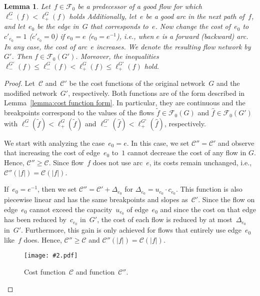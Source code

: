 \documentclass[11pt]{article}
\newtheorem{lemma}[theorem]{Lemma}
\newcommand{\F}{\mathcal{F}}
\renewcommand{\sp}{\ell}
\newcommand{\COST}{\mathscr{C}}
\newcommand{\spm}[1][]{\sp^{#1}_{-}}
\newcommand{\spp}[1][]{\sp^{#1}_{+}}
\newcommand{\GFX}[2][]{\texttt{[image: \#2.pdf]}}
\newenvironment{fig}
{\begin{figure}[th]\begin{center}}
{\end{center}\end{figure}}
\newenvironment{GFXFIG}[2][]
{\begin{fig}\GFX[#1]{#2}}
{\end{fig}}
\begin{document}
\begin{lemma}
\label{lemma:cost monotonicity}
Let~$f \in \F_0$ be a predecessor of a good flow for which $\spm[G](f) < \spp[G](f)$ holds Additionally, let~$e$ be a good arc in the next path of~$f$, and let~$e_0$ be the edge in~$G$ that corresponds to~$e$. Now change the cost of~$e_0$ to $c'_{e_0} = 1$ ($c'_{e_0} = 0$) if $e_0 = e$ ($e_0 = e^{-1}$), i.e., when $e$ is a forward (backward) arc. In any case, the cost of arc~$e$ increases. We denote the resulting flow network by~$G'$. Then $f \in \F_0(G')$. Moreover, the inequalities
$
  \spm[G'](f) \leq \spm[G](f) < \spp[G](f) \leq \spp[G'](f)
$
hold.
\end{lemma}

\begin{proof}
Let~$\COST$ and~$\COST'$ be the cost functions of the original network~$G$ and the modified network~$G'$, respectively.
Both functions are of the form described in Lemma~\ref{lemma:cost function form}. In particular, they are continuous and the breakpoints correspond to the values of the flows $\tilde{f} \in \F_0(G)$ and $\hat{f} \in \F_0(G')$ with $\spm[G](\tilde{f}) < \spp[G](\tilde{f})$ and $\spm[G'](\hat{f}) < \spp[G'](\hat{f})$, respectively.

We start with analyzing the case~$e_0 = e$. In this case, we set $\COST'' = \COST'$ and observe that increasing the cost of edge~$e_0$ to~$1$ cannot decrease the cost of any flow in $G$. Hence, $\COST'' \geq \COST$. Since flow~$f$ does not use arc~$e$, its costs remain unchanged, i.e., $\COST''(|f|) = \COST(|f|)$.

If~$e_0 = e^{-1}$, then we set $\COST'' = \COST' + \Delta_{e_0}$ for $\Delta_{e_0} = u_{e_0} \cdot c_{e_0}$. This function is also piecewise linear and has the same breakpoints and slopes as~$\COST'$. Since the flow on edge~$e_0$ cannot exceed the capacity~$u_{e_0}$ of edge~$e_0$ and since the cost on that edge has been reduced by~$c_{e_0}$ in~$G'$, the cost of each flow is reduced by at most~$\Delta_{e_0}$ in~$G'$. Furthermore, this gain is only achieved for flows that entirely use edge~$e_0$ like~$f$ does. Hence, $\COST'' \geq \COST$ and $\COST''(|f|) = \COST(|f|)$.

\begin{GFXFIG}[width=0.5\textwidth]{CostMonotonicity}
\caption{Cost function~$\COST$ and function~$\COST''$.}
\label{fig:cost monotonicity}
\end{GFXFIG}


\end{proof}
\end{document}
